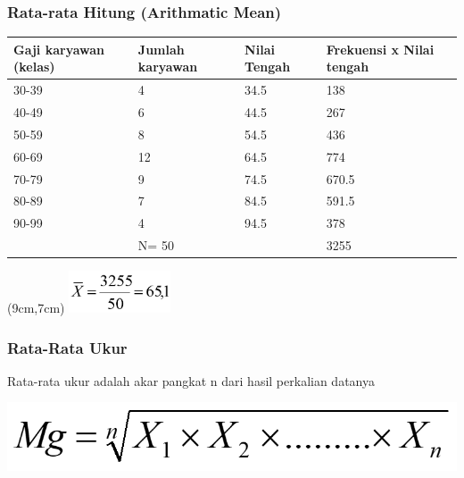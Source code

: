 \documentclass[main.tex]{subfiles}
\begin{document}
\begin{frame}[c]
	\frametitle{Rata-rata Hitung (Arithmatic Mean)}
	\small
	\begin{table}[htb]
		\begin{tabular}{p{1.5cm}p{1.5cm}p{1.5cm}p{1.5cm}}
			\hline
			Gaji karyawan (kelas)  &  Jumlah karyawan  &  Nilai Tengah  &  Frekuensi x Nilai tengah  \\
			\hline
			30-39                  &  4                &  34.5          &  138  \\
			40-49                  &  6                &  44.5          &  267  \\
			50-59                  &  8                &  54.5          &  436  \\
			60-69                  &  12               &  64.5          &  774  \\
			70-79                  &  9                &  74.5          &  670.5  \\
			80-89                  &  7                &  84.5          &  591.5  \\
			90-99                  &  4                &  94.5          &  378  \\
			\hline
			                       &  N= 50            &                &  3255  \\
		\end{tabular}
	\end{table}
	\begin{textblock*}{2cm}(9cm,7cm) %
		\includegraphics[width=3cm]{figures/mean4}
	\end{textblock*}

\end{frame}

\begin{frame}[c]
	\frametitle{Rata-Rata Ukur}
	Rata-rata ukur adalah akar pangkat n dari hasil perkalian datanya

	\begin{center}
		\includegraphics[scale=.5]{figures/mean5}
	\end{center}
\end{frame}
\end{document}
